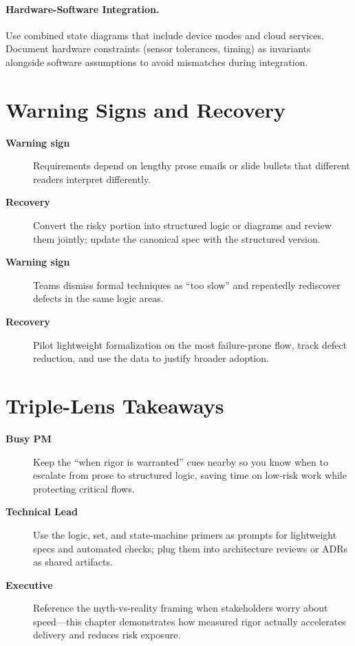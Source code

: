 \paragraph{Hardware-Software Integration.} Use combined state diagrams that include device modes and cloud services. Document hardware constraints (sensor tolerances, timing) as invariants alongside software assumptions to avoid mismatches during integration.
\section{Warning Signs and Recovery}
\label{sec:math-warning}
\begin{description}
    \item[\textbf{Warning sign}] Requirements depend on lengthy prose emails or slide bullets that different readers interpret differently.
    \item[\textbf{Recovery}] Convert the risky portion into structured logic or diagrams and review them jointly; update the canonical spec with the structured version.
    \item[\textbf{Warning sign}] Teams dismiss formal techniques as ``too slow'' and repeatedly rediscover defects in the same logic areas.
    \item[\textbf{Recovery}] Pilot lightweight formalization on the most failure-prone flow, track defect reduction, and use the data to justify broader adoption.
\end{description}

\section{Triple-Lens Takeaways}
\label{sec:math-rigor-triple}

\begin{description}
    \item[\textbf{Busy PM}] Keep the ``when rigor is warranted'' cues nearby so you know when to escalate from prose to structured logic, saving time on low-risk work while protecting critical flows.
    \item[\textbf{Technical Lead}] Use the logic, set, and state-machine primers as prompts for lightweight specs and automated checks; plug them into architecture reviews or ADRs as shared artifacts.
    \item[\textbf{Executive}] Reference the myth-vs-reality framing when stakeholders worry about speed—this chapter demonstrates how measured rigor actually accelerates delivery and reduces risk exposure.
\end{description}
